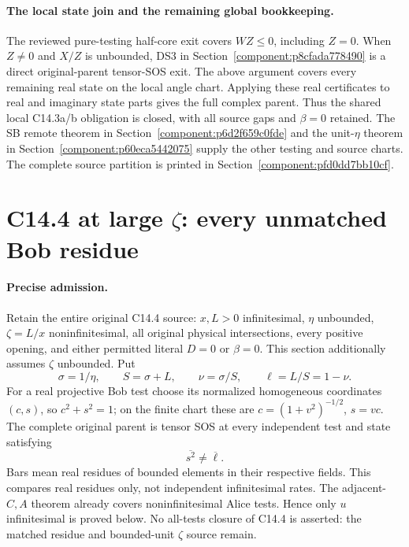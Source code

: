 \paragraph{The local state join and the remaining global bookkeeping.}
The reviewed pure-testing half-core exit covers $WZ\le0$, including
$Z=0$.  When $Z\ne0$ and $X/Z$ is unbounded, DS3 in Section~\ref{component:p8cfada778490} is a direct
original-parent tensor-SOS exit.  The above argument covers every
remaining real state on the local angle chart.  Applying these real
certificates to real and imaginary state parts gives the full complex
parent.  Thus the shared local C14.3a/b obligation is closed, with
all source gaps and $\beta=0$ retained.  The SB remote theorem in Section~\ref{component:p6d2f659c0fde} and the unit-$\eta$ theorem in Section~\ref{component:p60eca5442075} supply the other testing and source charts. The complete source partition is printed in Section~\ref{component:pfd0dd7bb10cf}.




\section{\texorpdfstring{C14.4 at large $\zeta$: every unmatched Bob residue}{C14.4 at large zeta: every unmatched Bob residue}}
\label{component:p1a6cc124f5db}

\label{p1a6cc124f5db:sec:r18-c144-bob-residue}

\paragraph{Precise admission.}
Retain the entire original C14.4 source: $x,L>0$ infinitesimal,
$\eta$ unbounded, $\zeta=L/x$ noninfinitesimal, all original physical
intersections, every positive opening, and either permitted literal
$D=0$ or $\beta=0$. This section additionally assumes $\zeta$
unbounded. Put
\[
 \sigma=1/\eta,\qquad S=\sigma+L,\qquad
 \nu=\sigma/S,\qquad \ell=L/S=1-\nu.
\]
For a real projective Bob test choose its normalized homogeneous
coordinates $(c,s)$, so $c^2+s^2=1$; on the finite chart these are
$c=(1+v^2)^{-1/2}$, $s=vc$. The complete original parent is tensor SOS
at every independent test and state satisfying
\[
                         \overline{s^2}\ne\overline\ell.       \tag{EB1}
\]
Bars mean real residues of bounded elements in their respective fields.
This compares real residues only, not independent infinitesimal rates.
The adjacent-$C,A$ theorem already covers noninfinitesimal Alice
tests. Hence only $u$ infinitesimal is proved below. No all-tests
closure of C14.4 is asserted: the matched residue and bounded-unit
$\zeta$ source remain.

